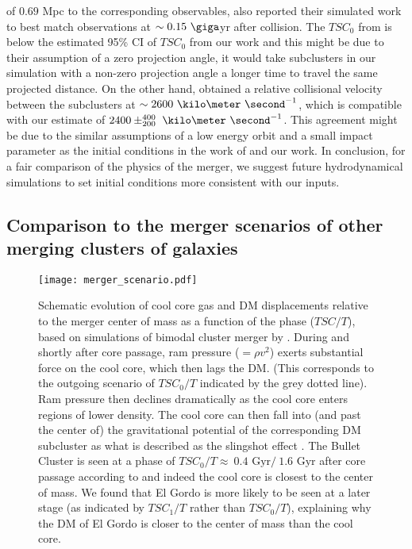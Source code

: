 of $0.69$ Mpc to the corresponding observables, \cite{Donnert13} also reported their simulated work 
to best match  observations at $\sim 0.15~\giga$yr after collision. 
The $TSC_0$ from \cite{Donnert13} is below the estimated 95\% CI of
$TSC_0$ from our work and this might be due to their assumption of a zero
projection angle, it would take subclusters in our simulation with a
non-zero projection angle a longer time to travel the same projected distance. 
On the other hand, \cite{Donnert13} obtained a
relative collisional velocity between the subclusters at $\sim
2600~\kilo\meter~\second^{-1}$, which is compatible with our estimate of
$2400\pm^{400}_{200}~\kilo\meter~\second^{-1}$.  
This agreement might be due to the similar assumptions of a low
energy orbit and a small impact parameter as the initial conditions in the
work of \cite{Donnert13} and our work. In conclusion, for a fair comparison
of the physics of the merger, we suggest future hydrodynamical simulations
to set initial conditions more consistent with our inputs.


\subsection{Comparison to the merger scenarios of other merging clusters of galaxies}

\begin{figure}
	\texttt{[image: merger\_scenario.pdf]}
 \caption{Schematic evolution of cool core gas and DM displacements relative to the
merger center of mass as a function of the phase ($TSC / T$), based on
simulations of bimodal cluster merger by \citet{Mathis05}. During and
shortly after core passage, ram pressure ($=\rho v^2$) exerts substantial
force on the cool core, which then lags the DM. (This corresponds to the
outgoing scenario of $TSC_0 / T$ indicated by the grey dotted line). Ram
pressure then declines dramatically as the cool core enters regions of
lower density.  The cool core can then fall into (and past the center of)
the gravitational potential of the corresponding DM subcluster as what is
described as the slingshot effect \citep{Markevitch2007}.  The Bullet
Cluster is seen at a phase of $TSC_0 / T \approx ~0.4\text{ Gyr} / ~1.6
\text{ Gyr}$ after core passage according
to  and indeed the cool core is closest to the center of
mass. We found that El Gordo is more likely to be seen at a later stage (as
indicated by $TSC_1 / T$ rather than $TSC_0 / T$), explaining why the DM of
El Gordo is closer to the center of mass than the cool core. \label{fig:merger_scenario}}
\end{figure}
	
